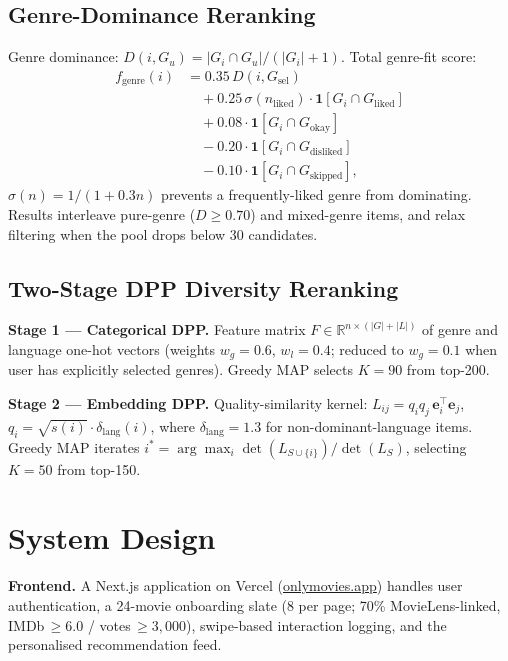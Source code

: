 \documentclass[conference]{IEEEtran}
\begin{document}
\subsection{Genre-Dominance Reranking}

Genre dominance:
$D(i,G_u) = |G_i\cap G_u|/(|G_i|+1)$.
Total genre-fit score:
\begin{align}
  f_\text{genre}(i) &= 0.35\,D(i,G_\text{sel}) \nonumber\\
  &\quad + 0.25\,\sigma(n_\text{liked})\cdot\mathbf{1}[G_i\cap G_\text{liked}] \nonumber\\
  &\quad + 0.08\cdot\mathbf{1}[G_i\cap G_\text{okay}] \nonumber\\
  &\quad - 0.20\cdot\mathbf{1}[G_i\cap G_\text{disliked}] \nonumber\\
  &\quad - 0.10\cdot\mathbf{1}[G_i\cap G_\text{skipped}],
\end{align}
$\sigma(n)=1/(1+0.3n)$ prevents a frequently-liked genre from dominating.
Results interleave pure-genre ($D\geq0.70$) and mixed-genre items,
and relax filtering when the pool drops below 30 candidates.

\subsection{Two-Stage DPP Diversity Reranking}

\textbf{Stage 1 --- Categorical DPP.}
Feature matrix $F\in\mathbb{R}^{n\times(|G|+|L|)}$ of genre and language
one-hot vectors (weights $w_g=0.6$, $w_l=0.4$; reduced to $w_g=0.1$
when user has explicitly selected genres).
Greedy MAP selects $K=90$ from top-200.

\textbf{Stage 2 --- Embedding DPP.}
Quality-similarity kernel:
$L_{ij}=q_i q_j\,\mathbf{e}_i^\top\mathbf{e}_j$,
$q_i=\sqrt{s(i)}\cdot\delta_\text{lang}(i)$,
where $\delta_\text{lang}=1.3$ for non-dominant-language items.
Greedy MAP iterates $i^*=\arg\max_i\det(L_{S\cup\{i\}})/\det(L_S)$,
selecting $K=50$ from top-150.

\section{System Design}

\textbf{Frontend.}
A Next.js application on Vercel (\url{onlymovies.app}) handles user
authentication, a 24-movie onboarding slate (8 per page; 70\%
MovieLens-linked, IMDb$\,\geq6.0$ / votes$\,\geq3{,}000$),
swipe-based interaction logging, and the personalised recommendation feed.
\end{document}
